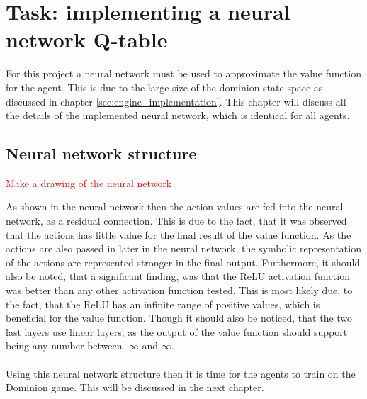 \chapter{Task: implementing a neural network Q-table} \label{ch:neural_networks}
For this project a neural network must be used to approximate the value function for the agent. This is due to the large size of the dominion state space as discussed in chapter \ref{sec:engine_implementation}. This chapter will discuss all the details of the implemented neural network, which is identical for all agents.

\section{Neural network structure}
\textcolor{red}{Make a drawing of the neural network}

As shown in the neural network then the action values are fed into the neural network, as a residual connection. This is due to the fact, that it was observed that the actions has little value for the final result of the value function. As the actions are also passed in later in the neural network, the symbolic representation of the actions are represented stronger in the final output. Furthermore, it should also be noted, that a significant finding, was that the ReLU activation function was better than any other activation function tested. This is most likely due, to the fact, that the ReLU has an infinite range of positive values, which is beneficial for the value function. Though it should also be noticed, that the two last layers use linear layers, as the output of the value function should support being any number between -$\infty$ and $\infty$.\\\\
Using this neural network structure then it is time for the agents to train on the Dominion game. This will be discussed in the next chapter.